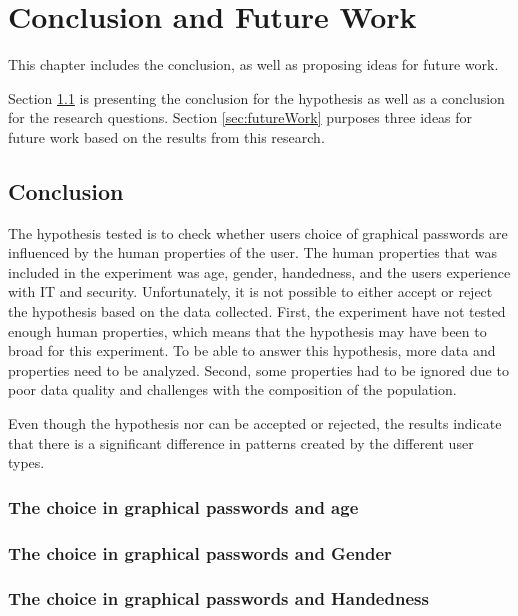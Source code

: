 \chapter{Conclusion and Future Work}\label{chap:conclusion}
  
  This chapter includes the conclusion, as well as proposing ideas for future work. 

  Section \ref{sec:conclusion} is presenting the conclusion for the hypothesis as well as a conclusion for the research questions. Section \ref{sec:futureWork} purposes three ideas for future work based on the results from this research. 

  \clearpage
  \section{Conclusion}\label{sec:conclusion}
    
    The hypothesis tested is to check whether users choice of graphical passwords are influenced by the human properties of the user. The human properties that was included in the experiment was age, gender, handedness, and the users experience with IT and security. 
    Unfortunately, it is not possible to either accept or reject the hypothesis based on the data collected. First, the experiment have not tested enough human properties, which means that the hypothesis may have been to broad for this experiment. To be able to answer this hypothesis, more data and properties need to be analyzed. Second, some properties had to be ignored due to poor data quality and challenges with the composition of the population.

    Even though the hypothesis nor can be accepted or rejected, the results indicate that there is a significant difference in patterns created by the different user types. 


    \subsection*{The choice in graphical passwords and age} 

    \subsection*{The choice in graphical passwords and Gender}

    \subsection*{The choice in graphical passwords and Handedness}


